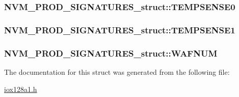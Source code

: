 \label{struct_n_v_m___p_r_o_d___s_i_g_n_a_t_u_r_e_s__struct_ae73b821fa188434f1ab19a50101d3140}
\hypertarget{struct_n_v_m___p_r_o_d___s_i_g_n_a_t_u_r_e_s__struct_a521792a8652de4879f8f490a3636b8e3}{
\subsubsection[{TEMPSENSE0}]{ {\bf NVM\_\-PROD\_\-SIGNATURES\_\-struct::TEMPSENSE0}}}
\label{struct_n_v_m___p_r_o_d___s_i_g_n_a_t_u_r_e_s__struct_a521792a8652de4879f8f490a3636b8e3}
\hypertarget{struct_n_v_m___p_r_o_d___s_i_g_n_a_t_u_r_e_s__struct_a5feb0627f3562391445b1949611e5a8d}{
\subsubsection[{TEMPSENSE1}]{ {\bf NVM\_\-PROD\_\-SIGNATURES\_\-struct::TEMPSENSE1}}}
\label{struct_n_v_m___p_r_o_d___s_i_g_n_a_t_u_r_e_s__struct_a5feb0627f3562391445b1949611e5a8d}
\hypertarget{struct_n_v_m___p_r_o_d___s_i_g_n_a_t_u_r_e_s__struct_a1a99a7590f598252630b3b7e6dfc082a}{
\subsubsection[{WAFNUM}]{ {\bf NVM\_\-PROD\_\-SIGNATURES\_\-struct::WAFNUM}}}
\label{struct_n_v_m___p_r_o_d___s_i_g_n_a_t_u_r_e_s__struct_a1a99a7590f598252630b3b7e6dfc082a}


The documentation for this struct was generated from the following file:\begin{DoxyCompactItemize}
\item 
\hyperlink{iox128a1_8h}{iox128a1.h}\end{DoxyCompactItemize}
